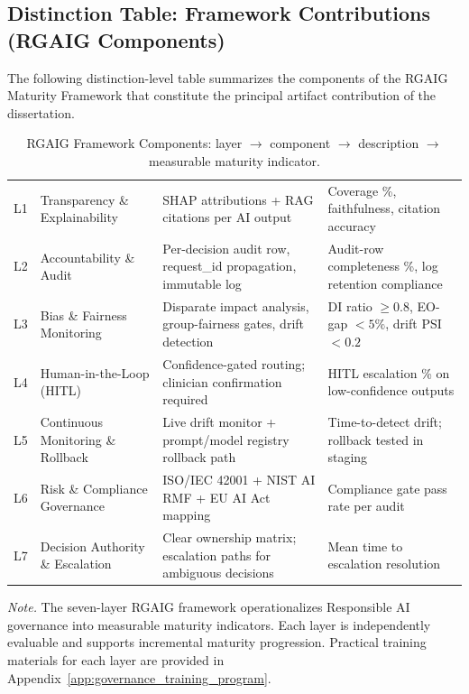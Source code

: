 \subsection{Distinction Table: Framework Contributions (RGAIG Components)}
\label{sec:distinction_framework_contribution}

\noindent The following distinction-level table summarizes the components of the RGAIG Maturity Framework that constitute the principal artifact contribution of the dissertation.

{\tablestripes\tablefontsize
{}
\begin{xltabular}{\textwidth}{@{} >{\centering\arraybackslash}p{1.5cm} >{\raggedright\arraybackslash}p{3.0cm} L L @{}}
\caption[Framework Contributions Table]{RGAIG Framework Components: layer $\rightarrow$ component $\rightarrow$ description $\rightarrow$ measurable maturity indicator.}\label{tab:distinction_framework_contribution} \\
\toprule
{} &  &  &  \\
\midrule
\endfirsthead
\endhead
\bottomrule
\endlastfoot
L1 & Transparency \& Explainability & SHAP attributions + RAG citations per AI output & Coverage \%, faithfulness, citation accuracy \\
\addlinespace
L2 & Accountability \& Audit & Per-decision audit row, request\_id propagation, immutable log & Audit-row completeness \%, log retention compliance \\
\addlinespace
L3 & Bias \& Fairness Monitoring & Disparate impact analysis, group-fairness gates, drift detection & DI ratio $\geq 0.8$, EO-gap $< 5\%$, drift PSI $< 0.2$ \\
\addlinespace
L4 & Human-in-the-Loop (HITL) & Confidence-gated routing; clinician confirmation required & HITL escalation \% on low-confidence outputs \\
\addlinespace
L5 & Continuous Monitoring \& Rollback & Live drift monitor + prompt/model registry rollback path & Time-to-detect drift; rollback tested in staging \\
\addlinespace
L6 & Risk \& Compliance Governance & ISO/IEC 42001 + NIST AI RMF + EU AI Act mapping & Compliance gate pass rate per audit \\
\addlinespace
L7 & Decision Authority \& Escalation & Clear ownership matrix; escalation paths for ambiguous decisions & Mean time to escalation resolution \\
\end{xltabular}}
\vspace{0.3em}\noindent\textit{Note.} The seven-layer RGAIG framework operationalizes Responsible AI governance into measurable maturity indicators. Each layer is independently evaluable and supports incremental maturity progression. Practical training materials for each layer are provided in Appendix~\ref{app:governance_training_program}.


